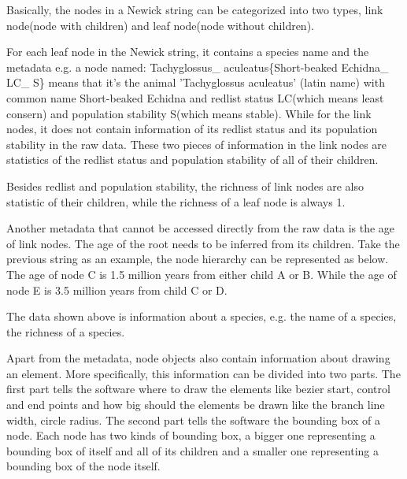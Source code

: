 \documentclass[MSc]{icldt}
\begin{document}
Basically, the nodes in a Newick string can be categorized into two types, link node(node with children) and leaf node(node without children).

For each leaf node in the Newick string, it contains a species name and the metadata e.g. a node named: Tachyglossus\_ aculeatus\{Short-beaked Echidna\_ LC\_ S\} means that it's the animal 'Tachyglossus aculeatus' (latin name) with common name Short-beaked Echidna and redlist status LC(which means least consern) and population stability S(which means stable). While for the link nodes, it does not contain information of its redlist status and its population stability in the raw data. These two pieces of information in the link nodes are statistics of the redlist status and population stability of all of their children. 

Besides redlist and population stability, the richness of link nodes are also statistic of their children, while the richness of a leaf node is always 1. 

Another metadata that cannot be accessed directly from the raw data is the age of link nodes. The age of the root needs to be inferred from its children. Take the previous string as an example, the node hierarchy can be represented as below. The age of node C is 1.5 million years from either child A or B. While the age of node E is 3.5 million years from child C or D.

\begin{center}
\end{center}

The data shown above is information about a species, e.g. the name of a species, the richness of a species. 

Apart from the metadata, node objects also contain information about drawing an element. More specifically, this information can be divided into two parts. The first part tells the software where to draw the elements like bezier start, control and end points and how big should the elements be drawn like the branch line width, circle radius. The second part tells the software the bounding box of a node. Each node has two kinds of bounding box, a bigger one representing a bounding box of itself and all of its children and a smaller one representing a bounding box of the node itself. 
\end{document}
